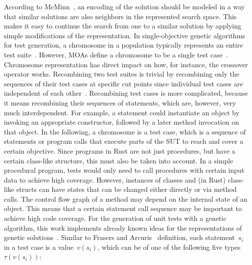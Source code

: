 \documentclass{article}
\begin{document}
According to McMinn~\cite{McMinn_2004}, an encoding of the solution should be modeled in a way that similar solutions are also neighbors in the represented search space. This makes it easy to continue the search from one to a similar solution by applying simple modifications of the representation. In single-objective genetic algorithms for test generation, a chromosome in a population typically represents an entire test suite~\cite{Fraser_2011, Campos2017}. However, \acp{MOA} define a chromosome to be a single test case~\cite{Panichella2018}. Chromosome representation has direct impact on how, for instance, the crossover operator works. Recombining two test suites is trivial by recombining only the sequences of their test cases at specific cut points since individual test cases are independent of each other~\cite{Fraser_2013}. Recombining test cases is more complicated, because it means recombining their sequences of statements, which are, however, very much interdependent. For example, a statement could instantiate an object by invoking an appropriate constructor, followed by a later method invocation on that object. In the following, a chromosome is a test case, which is a sequence of statements or program calls that execute parts of the \ac{SUT} to reach and cover a certain objective. Since programs in Rust are not just procedures, but have a certain class-like structure, this must also be taken into account. In a simple procedural program, tests would only need to call procedures with certain input data to achieve high coverage. However, instances of classes and (in Rust) class-like structs can have states that can be changed either directly or via method calls. The control flow graph of a method may depend on the internal state of an object. This means that a certain statement call sequence may be important to achieve high code coverage. For the generation of unit tests with a genetic algorithm, this work implements already known ideas for the representations of genetic solutions~\cite{Fraser2012,Tonella2004,Arcuri2008}. Similar to Frasers and Arcuris~\cite{Fraser_2011} definition, each statement~$s_i$ in a test case is a value~$v(s_i)$, which can be of one of the following five types~$\tau(v(s_i))$: 
\end{document}
